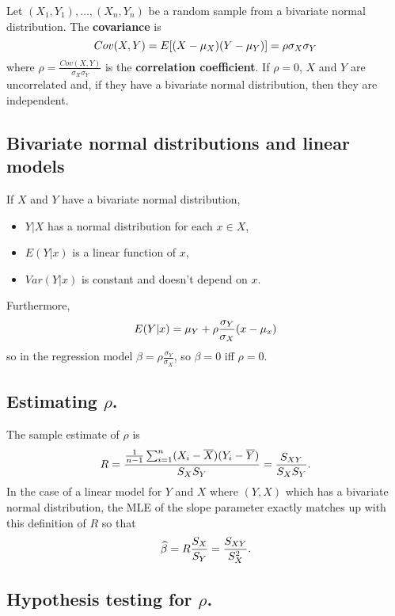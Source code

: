 \documentclass[10pt, two column]{article}
\begin{document}
Let $(X_{1},Y_{1}), \dots, (X_{n},Y_{n})$ be a random sample from a bivariate normal distribution. The {\bf covariance} is \vspace{-5pt}
\[
Cov(X,Y) = E[(X - \mu_{X})(Y - \mu_{Y})] = \rho \sigma_{X} \sigma_{Y} \vspace{-5pt}
\] 
where $\rho = \frac{Cov(X,Y)}{\sigma_{X}\sigma_{Y}}$ is the {\bf correlation coefficient}. If $\rho = 0$, $X$ and $Y$ are uncorrelated and, if they have a bivariate normal distribution, then they are independent. 

\subsection{Bivariate normal distributions and linear models} \label{linear models and corr}

If $X$ and $Y$ have a bivariate normal distribution,
\begin{itemize}
\item $Y \vert X$ has a normal distribution for each $x \in X$,
\item $E(Y \vert x)$ is a linear function of $x$,
\item $Var(Y \vert x)$ is constant and doesn't depend on $x$. 
\end{itemize}
Furthermore, \vspace{-5pt}
\[
E(Y \vert x) = \mu_{Y} + \rho \frac{\sigma_{Y}}{\sigma_{X}}(x - \mu_{x}) \vspace{-5pt}
\]
so in the regression model $\beta = \rho \frac{\sigma_{Y}}{\sigma_{X}}$, so $\beta = 0$ iff $\rho = 0$. 

\subsection{Estimating $\rho$.} \label{estimating rho}

The sample estimate of $\rho$ is \vspace{-5pt}
\[
R = \frac{\frac{1}{n-1} \sum_{i=1}^{n} (X_{i} - \overline{X})(Y_{i} - \overline{Y})}{S_{X}S_{Y}} = \frac{S_{XY}}{S_{X}S_{Y}}. \vspace{-5pt}
\]
In the case of a linear model for $Y$ and $X$ where $(Y,X)$ which has a bivariate normal distribution, the MLE of the slope parameter exactly matches up with this definition of $R$ so that 
\[
\widehat{\beta} = R \frac{S_{X}}{S_{Y}} = \frac{S_{XY}}{S_{X}^{2}}. \vspace{-5pt}
\]

\subsection{Hypothesis testing for $\rho$.}
\end{document}
